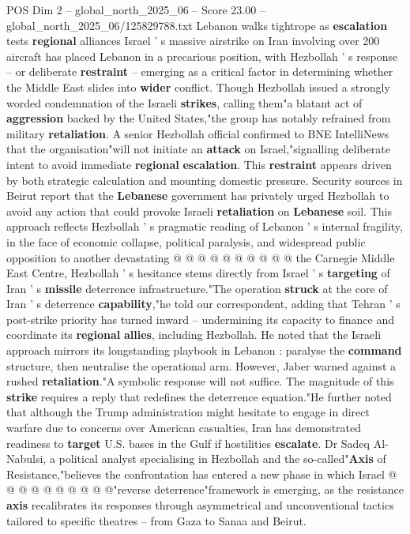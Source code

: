 \begin{textsample}{POS Dim 2 – global\_north\_2025\_06 – Score 23.00 – global\_north\_2025\_06/125829788.txt}  \label{ex:f2_pos_355}
Lebanon walks tightrope as \textbf{escalation} tests \textbf{regional} alliances Israel ' s massive airstrike on Iran involving over 200 aircraft has placed Lebanon in a precarious position, with Hezbollah ' s response -- or deliberate \textbf{restraint} -- emerging as a critical factor in determining whether the Middle East slides into \textbf{wider} conflict.
Though Hezbollah issued a strongly worded condemnation of the Israeli \textbf{strikes}, calling them"a blatant act of \textbf{aggression} backed by the United States,"the group has notably refrained from military \textbf{retaliation}.
A senior Hezbollah official confirmed to BNE IntelliNews that the organisation"will not initiate an \textbf{attack} on Israel,"signalling deliberate intent to avoid immediate \textbf{regional} \textbf{escalation}.
This \textbf{restraint} appears driven by both strategic calculation and mounting domestic pressure.
Security sources in Beirut report that the \textbf{Lebanese} government has privately urged Hezbollah to avoid any action that could provoke Israeli \textbf{retaliation} on \textbf{Lebanese} soil.
This approach reflects Hezbollah ' s pragmatic reading of Lebanon ' s internal fragility, in the face of economic collapse, political paralysis, and widespread public opposition to another devastating @ @ @ @ @ @ @ @ @ @ the Carnegie Middle East Centre, Hezbollah ' s hesitance stems directly from Israel ' s \textbf{targeting} of Iran ' s \textbf{missile} deterrence infrastructure."The operation \textbf{struck} at the core of Iran ' s deterrence \textbf{capability},"he told our correspondent, adding that Tehran ' s post-strike priority has turned inward -- undermining its capacity to finance and coordinate its \textbf{regional} \textbf{allies}, including Hezbollah.
He noted that the Israeli approach mirrors its longstanding playbook in Lebanon : paralyse the \textbf{command} structure, then neutralise the operational arm.
However, Jaber warned against a rushed \textbf{retaliation}."A symbolic response will not suffice.
The magnitude of this \textbf{strike} requires a reply that redefines the deterrence equation."He further noted that although the Trump administration might hesitate to engage in direct warfare due to concerns over American casualties, Iran has demonstrated readiness to \textbf{target} U.S. bases in the Gulf if hostilities \textbf{escalate}.
Dr Sadeq Al-Nabulsi, a political analyst specialising in Hezbollah and the so-called"\textbf{Axis} of Resistance,"believes the confrontation has entered a new phase in which Israel @ @ @ @ @ @ @ @ @ @"reverse deterrence"framework is emerging, as the resistance \textbf{axis} recalibrates its responses through asymmetrical and unconventional tactics tailored to specific theatres -- from Gaza to Sanaa and Beirut.

\end{textsample}
